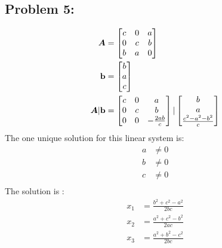 \documentclass{article}
\begin{document}
\subsection*{{Problem 5: }}
\label{}
\begin{align*}
\boldsymbol{A} &= \begin{bmatrix} c & 0 & a \\ 0 & c & b \\ b & a & 0  \end{bmatrix} \\
\boldsymbol{\mathrm{b}} &= \begin{bmatrix} b \\ a \\ c  \end{bmatrix} \\
\boldsymbol{A} | \boldsymbol{\mathrm{b}} &= \begin{bmatrix} c & 0 & a \\ 0 & c & b \\ 0 & 0 & -\frac{2ab}{c}  \end{bmatrix} | \begin{bmatrix}  b \\ a \\  \frac{c^2 - a^2 - b^2}{c} \end{bmatrix}
\end{align*}
The one unique solution for this linear system is:  \begin{align*} a & \neq 0 \\ b & \neq 0 \\ c & \neq 0 \\ \end{align*} 
The solution is : 
\begin{align*} 
x_1 & = \frac{b^2+c^2-a^2}{2bc} \\
x_2 & = \frac{a^2+c^2-b^2}{2ac} \\
x_3 & = \frac{a^2+b^2-c^2}{2bc} \\ 
\end{align*} 


\hypertarget{}{}
\end{document}

